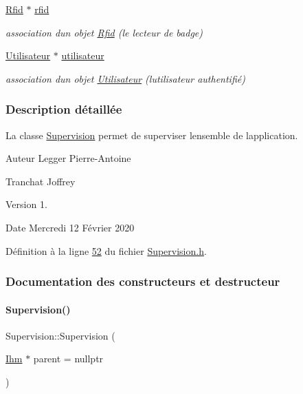 \begin{DoxyCompactItemize}
\hyperlink{class_rfid}{Rfid} $\ast$ \hyperlink{class_supervision_a3ec5986105208e9a2b02b7e97bf61090}{rfid}
\begin{DoxyCompactList}\small\item\em association d\textquotesingle{}un objet \hyperlink{class_rfid}{Rfid} (le lecteur de badge) \end{DoxyCompactList}\item 
\hyperlink{class_utilisateur}{Utilisateur} $\ast$ \hyperlink{class_supervision_a92384f2b12b2549cee988f83add8ad49}{utilisateur}
\begin{DoxyCompactList}\small\item\em association d\textquotesingle{}un objet \hyperlink{class_utilisateur}{Utilisateur} (l\textquotesingle{}utilisateur authentifié) \end{DoxyCompactList}\end{DoxyCompactItemize}


\subsubsection{Description détaillée}
La classe \hyperlink{class_supervision}{Supervision} permet de superviser l\textquotesingle{}ensemble de l\textquotesingle{}application. 

\begin{DoxyAuthor}{Auteur}
Legger Pierre-\/\+Antoine 

Tranchat Joffrey
\end{DoxyAuthor}
\begin{DoxyVersion}{Version}
1.
\end{DoxyVersion}
\begin{DoxyDate}{Date}
Mercredi 12 Février 2020 
\end{DoxyDate}


Définition à la ligne \hyperlink{_supervision_8h_source_l00052}{52} du fichier \hyperlink{_supervision_8h_source}{Supervision.\+h}.



\subsubsection{Documentation des constructeurs et destructeur}
\mbox{\label{class_supervision_af3f0ed8f5aadd6b4aa5e0eac2813d8c4}} 
\paragraph{\texorpdfstring{Supervision()}{Supervision()}}
{\footnotesize\ttfamily Supervision\+::\+Supervision (\begin{DoxyParamCaption}\item[{\hyperlink{class_ihm}{Ihm} $\ast$}]{parent = {\ttfamily nullptr} }\end{DoxyParamCaption})}



